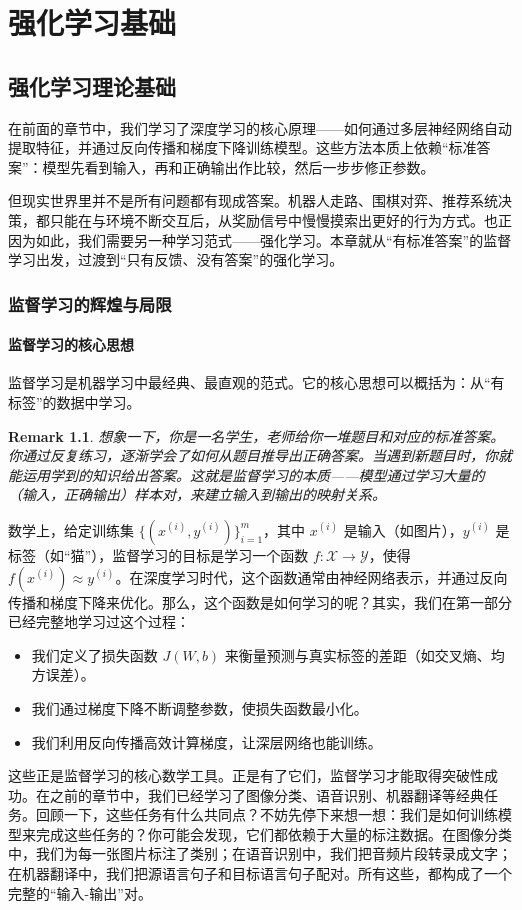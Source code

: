 \documentclass[lang=cn,zihao=-4,a4paper,fontset=windows]{beautybook}
\newtheorem*{remark}{\textbf{Remark}}
\begin{document}
\part{强化学习基础}

\chapter{强化学习理论基础}

在前面的章节中，我们学习了深度学习的核心原理——如何通过多层神经网络自动提取特征，并通过反向传播和梯度下降训练模型。这些方法本质上依赖“标准答案”：模型先看到输入，再和正确输出作比较，然后一步步修正参数。

但现实世界里并不是所有问题都有现成答案。机器人走路、围棋对弈、推荐系统决策，都只能在与环境不断交互后，从奖励信号中慢慢摸索出更好的行为方式。也正因为如此，我们需要另一种学习范式——强化学习。本章就从“有标准答案”的监督学习出发，过渡到“只有反馈、没有答案”的强化学习。

\section{监督学习的辉煌与局限}

\subsection{监督学习的核心思想}

监督学习是机器学习中最经典、最直观的范式。它的核心思想可以概括为：从“有标签”的数据中学习。
\begin{remark}
想象一下，你是一名学生，老师给你一堆题目和对应的标准答案。你通过反复练习，逐渐学会了如何从题目推导出正确答案。当遇到新题目时，你就能运用学到的知识给出答案。这就是监督学习的本质——模型通过学习大量的（输入，正确输出）样本对，来建立输入到输出的映射关系。
\end{remark}
数学上，给定训练集 \(\{(x^{(i)}, y^{(i)})\}_{i=1}^m\)，其中 \(x^{(i)}\) 是输入（如图片），\(y^{(i)}\) 是标签（如“猫”），监督学习的目标是学习一个函数 \(f: \mathcal{X} \rightarrow \mathcal{Y}\)，使得 \(f(x^{(i)}) \approx y^{(i)}\)。在深度学习时代，这个函数通常由神经网络表示，并通过反向传播和梯度下降来优化。那么，这个函数是如何学习的呢？其实，我们在第一部分已经完整地学习过这个过程：
\begin{itemize}
\item 我们定义了损失函数 \(J(W,b)\) 来衡量预测与真实标签的差距（如交叉熵、均方误差）。
\item 我们通过梯度下降不断调整参数，使损失函数最小化。
\item 我们利用反向传播高效计算梯度，让深层网络也能训练。
\end{itemize}
这些正是监督学习的核心数学工具。正是有了它们，监督学习才能取得突破性成功。在之前的章节中，我们已经学习了图像分类、语音识别、机器翻译等经典任务。回顾一下，这些任务有什么共同点？不妨先停下来想一想：我们是如何训练模型来完成这些任务的？你可能会发现，它们都依赖于大量的标注数据。在图像分类中，我们为每一张图片标注了类别；在语音识别中，我们把音频片段转录成文字；在机器翻译中，我们把源语言句子和目标语言句子配对。所有这些，都构成了一个完整的“输入-输出”对。
\end{document}
